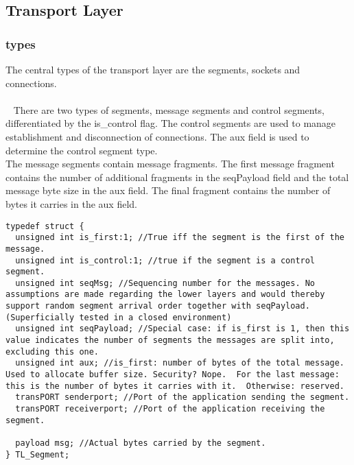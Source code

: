 \subsection{Transport Layer}
\subsubsection{types}
The central types of the transport layer are the segments, sockets and connections.\\
\\~
There are two types of segments, message segments and control segments, differentiated by the is\_control flag. The control segments are used to manage establishment and disconnection of connections. The aux field is used to determine the control segment type.\\
The message segments contain message fragments. The first message fragment contains the number of additional fragments in the seqPayload field and the total message byte size in the aux field. The final fragment contains the number of bytes it carries in the aux field.

\begin{lstlisting}
typedef struct {
  unsigned int is_first:1; //True iff the segment is the first of the message.
  unsigned int is_control:1; //true if the segment is a control segment.
  unsigned int seqMsg; //Sequencing number for the messages. No assumptions are made regarding the lower layers and would thereby support random segment arrival order together with seqPayload. (Superficially tested in a closed environment)
  unsigned int seqPayload; //Special case: if is_first is 1, then this value indicates the number of segments the messages are split into, excluding this one.
  unsigned int aux; //is_first: number of bytes of the total message. Used to allocate buffer size. Security? Nope.  For the last message: this is the number of bytes it carries with it.  Otherwise: reserved.
  transPORT senderport; //Port of the application sending the segment.
  transPORT receiverport; //Port of the application receiving the segment.

  payload msg; //Actual bytes carried by the segment.
} TL_Segment;
\end{lstlisting}

